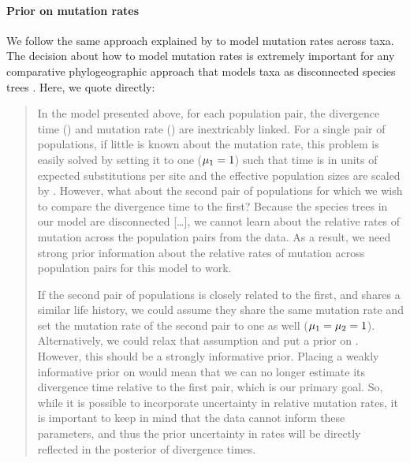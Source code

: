 \paragraph{Prior on mutation rates}
We follow the same approach explained by \citet{Oaks2018ecoevolity} to model
mutation rates across taxa.
The decision about how to model mutation rates is extremely important for any
comparative phylogeographic approach that models taxa as disconnected
species trees
\citep[\fig{}~\ref{fig:modelCartoon}; e.g.,][]{Hickerson2006,Hickerson2007,Huang2011,Chan2014,Oaks2014dpp,Xue2015,Burbrink2016,Xue2017,Gehara2017,Oaks2018ecoevolity}.
Here, we quote \citet{Oaks2018ecoevolity} directly:
\begin{quotation}
In the model presented above, for each population pair, the divergence time
(\etime) and mutation rate (\murate) are inextricably linked.
For a single pair of populations, if little is known about the mutation rate,
this problem is easily solved by setting it to one ($\murate[1] = 1$) such
that time is in units of expected substitutions per site and the effective
population sizes are scaled by \murate.
However, what about the second pair of populations for which we wish to compare
the divergence time to the first?
Because the species trees in our model are disconnected
[\ldots],
we cannot learn about
the relative rates of mutation across the population pairs from the data.
As a result, we need strong prior information about the relative rates of
mutation across population pairs for this model to work.

If the second pair of populations is closely related to the first, and shares a
similar life history, we could assume they share the same mutation rate and
set the mutation rate of the second pair to one as well ($\murate[1] = \murate[2] = 1$).
Alternatively, we could relax that assumption and put a prior on \murate[2].
However, this should be a strongly informative prior.
Placing a weakly informative prior on \murate[2] would mean that we can no
longer estimate its divergence time relative to the first pair,
which is our primary goal.
So, while it is possible to incorporate uncertainty in relative mutation rates,
it is important to keep in mind that the data cannot inform these parameters,
and thus the prior uncertainty in rates will be directly reflected in the
posterior of divergence times.
\end{quotation}

